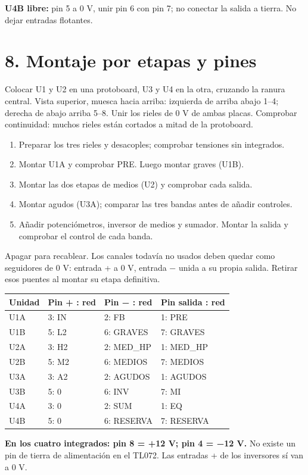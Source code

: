 \documentclass[10pt,a4paper]{article}
\newcommand{\siguientepagina}{\clearpage}
\begin{document}
\textbf{U4B libre:} pin 5 a 0 V, unir pin 6 con pin 7; no conectar la salida a tierra. No dejar entradas flotantes.
\siguientepagina
\section{8. Montaje por etapas y pines}
Colocar U1 y U2 en una protoboard, U3 y U4 en la otra, cruzando la ranura central. Vista superior, muesca hacia arriba: izquierda de arriba abajo 1--4; derecha de abajo arriba 5--8. Unir los rieles de 0 V de ambas placas. Comprobar continuidad: muchos rieles están cortados a mitad de la protoboard.

\begin{enumerate}
\item Preparar los tres rieles y desacoples; comprobar tensiones sin integrados.
\item Montar U1A y comprobar PRE. Luego montar graves (U1B).
\item Montar las dos etapas de medios (U2) y comprobar cada salida.
\item Montar agudos (U3A); comparar las tres bandas antes de añadir controles.
\item Añadir potenciómetros, inversor de medios y sumador. Montar la salida y comprobar el control de cada banda.
\end{enumerate}
Apagar para recablear. Los canales todavía no usados deben quedar como seguidores de 0 V: entrada + a 0 V, entrada − unida a su propia salida. Retirar esos puentes al montar su etapa definitiva.

\begin{tabularx}{\linewidth}{lXXX}\toprule Unidad & Pin + : red & Pin − : red & Pin salida : red\\\midrule
U1A & 3: IN & 2: FB & 1: PRE \\
U1B & 5: L2 & 6: GRAVES & 7: GRAVES \\
U2A & 3: H2 & 2: MED\_HP & 1: MED\_HP \\
U2B & 5: M2 & 6: MEDIOS & 7: MEDIOS \\
U3A & 3: A2 & 2: AGUDOS & 1: AGUDOS \\
U3B & 5: 0 & 6: INV & 7: MI \\
U4A & 3: 0 & 2: SUM & 1: EQ \\
U4B & 5: 0 & 6: RESERVA & 7: RESERVA \\

\bottomrule\end{tabularx}
\textbf{En los cuatro integrados: pin 8 = +12 V; pin 4 = −12 V.} No existe un pin de tierra de alimentación en el TL072. Las entradas + de los inversores sí van a 0 V.
\end{document}
